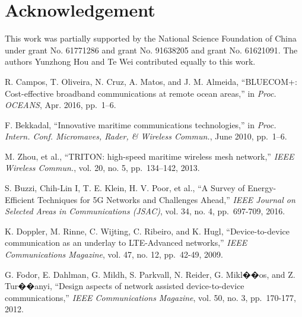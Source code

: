 \documentclass[conference]{IEEEtran}
\begin{document}
\section*{Acknowledgement}

This work was partially supported by the National Science Foundation of China under grant No. 61771286 and grant No. 91638205 and grant No. 61621091. The authors Yunzhong Hou and Te Wei contributed equally to this work.


\begin{thebibliography}{10}
  
  
  
  R. Campos, T. Oliveira, N. Cruz, A. Matos, and J. M. Almeida,
  ``BLUECOM+: Cost-effective broadband communications at remote ocean areas,'' in
  \emph{Proc. OCEANS}, Apr. 2016, pp.~1--6.
  
  F. Bekkadal, ``Innovative maritime communications technologies,'' in
  \emph{Proc. Intern. Conf. Micromaves, Rader, \& Wireless Commun.}, June 2010, pp.~1--6.
  
  M. Zhou, et al., ``TRITON: high-speed maritime wireless mesh network,''
  \emph{IEEE Wireless Commun.}, vol. 20, no. 5, pp.~134--142, 2013.
  
  
  S. Buzzi, Chih-Lin I, T. E. Klein, H. V. Poor, et al., ``A Survey of Energy-Efficient Techniques for 5G Networks and Challenges Ahead,''
  \emph{IEEE Journal on Selected Areas in Communications (JSAC)}, vol. 34, no. 4, pp.~697-709, 2016.
  
  K. Doppler, M. Rinne, C. Wijting, C. Ribeiro, and K. Hugl, ``Device-to-device communication as an underlay to LTE-Advanced networks,''
    \emph{IEEE Communications Magazine}, vol. 47, no. 12, pp.~42-49, 2009.
   
  G. Fodor, E. Dahlman, G. Mildh, S. Parkvall, N. Reider, G. Mikl��os, and Z. Tur��anyi, ``Design aspects of network assisted device-to-device communications,''
    \emph{IEEE Communications Magazine}, vol. 50, no. 3, pp.~170-177, 2012.
     

\end{thebibliography}
\end{document}
